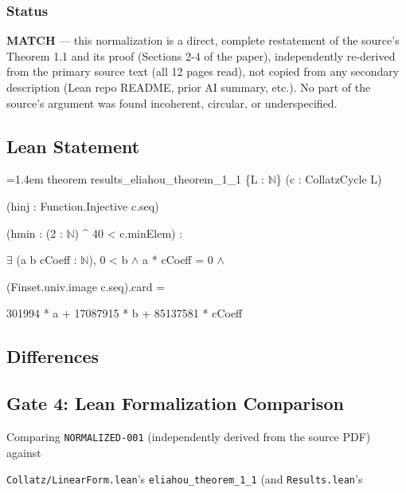 \documentclass[11pt]{article}
\begin{document}
\subsubsection*{Status}
\textbf{MATCH} --- this normalization is a direct, complete restatement of the source's Theorem 1.1 and its proof (Sections 2-4 of the paper), independently re-derived from the primary source text (all 12 pages read), not copied from any secondary description (Lean repo README, prior AI summary, etc.). No part of the source's argument was found incoherent, circular, or underspecified.


\subsection*{Lean Statement}
{\footnotesize\ttfamily\raggedright\hangindent=1.4em\noindent
\hspace*{0.00em}theorem results\_\allowbreak{}eliahou\_\allowbreak{}theorem\_\allowbreak{}1\_\allowbreak{}1 \{L : \ensuremath{\mathbb{N}}\} (c : CollatzCycle L)\par
\hspace*{2.20em}(hinj : Function.\allowbreak{}Injective c.\allowbreak{}seq)\par
\hspace*{2.20em}(hmin : (2 : \ensuremath{\mathbb{N}}) \textasciicircum{} 40 < c.\allowbreak{}minElem) :\par
\hspace*{2.20em}\ensuremath{\exists} (a b cCoeff : \ensuremath{\mathbb{N}}), 0 < b \ensuremath{\wedge} a * cCoeff = 0 \ensuremath{\wedge}\par
\hspace*{3.30em}(Finset.\allowbreak{}univ.\allowbreak{}image c.\allowbreak{}seq).\allowbreak{}card =\par
\hspace*{4.40em}301994 * a + 17087915 * b + 85137581 * cCoeff\par
}

\subsection*{Differences}
\subsection*{Gate 4: Lean Formalization Comparison}
Comparing \texttt{NORMALIZED-001} (independently derived from the source PDF) against

\texttt{Collatz/LinearForm.lean}'s \texttt{eliahou\_theorem\_1\_1} (and \texttt{Results.lean}'s
\end{document}

